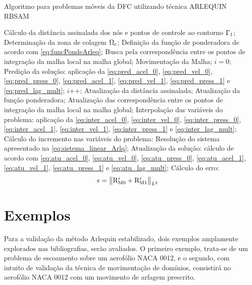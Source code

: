 \begin{algorithm}
	\caption{Algoritmo para problemas móveis da DFC utilizando técnica ARLEQUIN RBSAM}
	\label{alg:fluidARLQ}
	\begin{algorithmic}[1]
		\State Cálculo da distância assinalada dos nós e pontos de controle ao contorno $\Gamma_1$;
		\State Determinação da zona de colagem $\Omega_c$;
		\State Definição da função de ponderadora de acordo com \autoref{eq:funcPondeArleq};
		\State Busca pela correspondência entre os pontos de integração da malha local na malha global;
		\State Movimentação da Malha;
		\State $i=0$;
		\State Predição da solução: aplicação da \autoref{eq:pred_acel_0}, \autoref{eq:pred_vel_0}, \autoref{eq:pred_press_0},
		\autoref{eq:pred_acel_1}, \autoref{eq:pred_vel_1}, \autoref{eq:pred_press_1} e \autoref{eq:pred_lag_mult};
		\State $i$++;
		\State Atualização da distância assinalada;
		\State Atualização da função ponderadora;
		\State Atualização das correspondência entre os pontos de integração da malha local na malha global;
		\State Interpolação das variáveis do problema: aplicação da \autoref{eq:inter_acel_0}, \autoref{eq:inter_vel_0}, \autoref{eq:inter_press_0},
		\autoref{eq:inter_acel_1}, \autoref{eq:inter_vel_1}, \autoref{eq:inter_press_1} e \autoref{eq:inter_lag_mult}; 
		\State Cálculo do incremento nas variáveis do problema: Resolução do sistema apresentado na \autoref{eq:sistema_linear_Arlq};
		\State Atualização da solução: cálculo de acordo com \eqref{eq:atu_acel_0}, \autoref{eq:atu_vel_0}, \autoref{eq:atu_press_0},
		\autoref{eq:atu_acel_1}, \autoref{eq:atu_vel_1}, \autoref{eq:atu_press_1} e \autoref{eq:atu_lag_mult};
		\State Cálculo do erro:
		\begin{align}
			\epsilon =\left\| \mathrm{R}_\mathrm{M0}^{i} + \mathrm{R}_\mathrm{M1}^{i}  \right\|_{L^2}
		\end{align}
		\EndWhile
		\EndFor
	\end{algorithmic}
\end{algorithm}

\section{Exemplos}\label{capitulo:Cap6:Exemplos}

Para a validação da método Arlequin estabilizado, dois exemplos amplamente explorados nas bibliografias, serão avaliados. O primeiro exemplo, trata-se de um problema de escoamento sobre um aerofólio NACA 0012, e o segundo, com intuito de validação da técnica de movimentação de domínios, consistirá no aerofólio NACA 0012 com um movimento de arfagem prescrito. 

